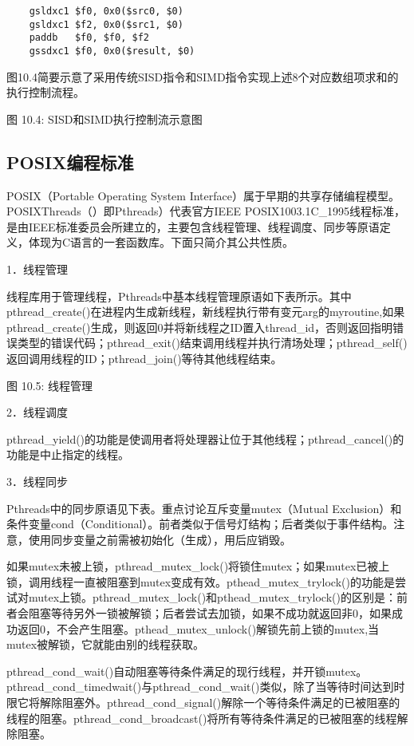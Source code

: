 \documentclass[]{ctexbook}
\begin{document}
\begin{verbatim}
    gsldxc1 $f0, 0x0($src0, $0)
    gsldxc1 $f2, 0x0($src1, $0)
    paddb   $f0, $f0, $f2
    gssdxc1 $f0, 0x0($result, $0)
\end{verbatim}

\hspace{0pt} 图10.4简要示意了采用传统SISD指令和SIMD指令实现上述8个对应数组项求和的执行控制流程。

图 10.4: SISD和SIMD执行控制流示意图

\hypertarget{posixux7f16ux7a0bux6807ux51c6}{%
\subsection{POSIX编程标准}\label{posixux7f16ux7a0bux6807ux51c6}}

POSIX（Portable Operating System Interface）属于早期的共享存储编程模型。POSIXThreads（）即Pthreads）代表官方IEEE POSIX1003.1C\_1995线程标准，是由IEEE标准委员会所建立的，主要包含线程管理、线程调度、同步等原语定义，体现为C语言的一套函数库。下面只简介其公共性质。

1．线程管理

线程库用于管理线程，Pthreads中基本线程管理原语如下表所示。其中pthread\_create()在进程内生成新线程，新线程执行带有变元arg的myroutine,如果pthread\_create()生成，则返回0并将新线程之ID置入thread\_id，否则返回指明错误类型的错误代码；pthread\_exit()结束调用线程并执行清场处理；pthread\_self()返回调用线程的ID；pthread\_join()等待其他线程结束。

图 10.5: 线程管理

2．线程调度

pthread\_yield()的功能是使调用者将处理器让位于其他线程；pthread\_cancel()的功能是中止指定的线程。

3．线程同步

Pthreads中的同步原语见下表。重点讨论互斥变量mutex（Mutual Exclusion）和条件变量cond（Conditional）。前者类似于信号灯结构；后者类似于事件结构。注意，使用同步变量之前需被初始化（生成），用后应销毁。

如果mutex未被上锁，pthread\_mutex\_lock()将锁住mutex；如果mutex已被上锁，调用线程一直被阻塞到mutex变成有效。pthead\_mutex\_trylock()的功能是尝试对mutex上锁。pthread\_mutex\_lock()和pthead\_mutex\_trylock()的区别是：前者会阻塞等待另外一锁被解锁；后者尝试去加锁，如果不成功就返回非0，如果成功返回0，不会产生阻塞。pthead\_mutex\_unlock()解锁先前上锁的mutex,当mutex被解锁，它就能由别的线程获取。

pthread\_cond\_wait()自动阻塞等待条件满足的现行线程，并开锁mutex。pthread\_cond\_timedwait()与pthread\_cond\_wait()类似，除了当等待时间达到时限它将解除阻塞外。pthread\_cond\_signal()解除一个等待条件满足的已被阻塞的线程的阻塞。pthread\_cond\_broadcast()将所有等待条件满足的已被阻塞的线程解除阻塞。
\end{document}
